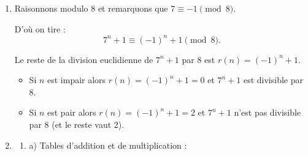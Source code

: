 \begin{enumerate}[label=\thechapter.\arabic*, font=\bfseries, itemsep=7mm,labelsep*=3mm,left=0mm]
\begin{enumerate}[label=\roman*)]
	On conclut avec : $$100^{1000} \equiv 9^{1000} \equiv \left(\left(9^{10}\right)^{10}\right)^{10} \equiv \left(9^{10}\right)^{10}  \equiv 9^{10} \equiv 9 \pmod{13}$$
\end{enumerate}




\item
Raisonnons modulo $8$ et remarquons que $7 \equiv -1 \pmod{8}.$

\smallskip
D'où on tire :
$$7^n +1 \equiv (-1)^n + 1 \pmod{8}.$$

Le reste de la division euclidienne de $7^n+1$ par $8$ est $r(n)=(-1)^n+1$.

\begin{itemize}
	\item Si $n$ est impair alors $r(n)=(-1)^n+1=0$ et $7^n+1$ est divisible par $8$.
	
	\item Si $n$ est pair alors $r(n)=(-1)^n+1=2$ et $7^n+1$ n'est pas divisible par $8$ (et le reste vaut $2$).
\end{itemize}


\item
\begin{enumerate}[label=\alph*),itemsep=5mm,left=-1mm,labelsep*=2mm]
	\item a) Tables d'addition et de multiplication :


\end{enumerate}
\end{enumerate}
